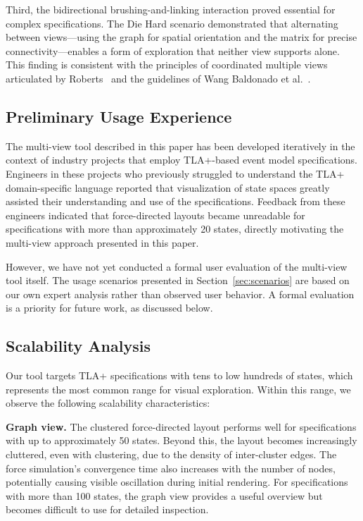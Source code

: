 \documentclass[conference]{IEEEtran}
\begin{document}
Third, the bidirectional brushing-and-linking interaction proved essential for complex specifications. The Die Hard scenario demonstrated that alternating between views---using the graph for spatial orientation and the matrix for precise connectivity---enables a form of exploration that neither view supports alone. This finding is consistent with the principles of coordinated multiple views articulated by Roberts~\cite{roberts2007cmv} and the guidelines of Wang Baldonado et al.~\cite{baldonado2000guidelines}.

\subsection{Preliminary Usage Experience}

The multi-view tool described in this paper has been developed iteratively in the context of industry projects that employ TLA+-based event model specifications. Engineers in these projects who previously struggled to understand the TLA+ domain-specific language reported that visualization of state spaces greatly assisted their understanding and use of the specifications. Feedback from these engineers indicated that force-directed layouts became unreadable for specifications with more than approximately 20 states, directly motivating the multi-view approach presented in this paper.

However, we have not yet conducted a formal user evaluation of the multi-view tool itself. The usage scenarios presented in Section~\ref{sec:scenarios} are based on our own expert analysis rather than observed user behavior. A formal evaluation is a priority for future work, as discussed below.

\subsection{Scalability Analysis}

Our tool targets TLA+ specifications with tens to low hundreds of states, which represents the most common range for visual exploration. Within this range, we observe the following scalability characteristics:

\textbf{Graph view.} The clustered force-directed layout performs well for specifications with up to approximately 50 states. Beyond this, the layout becomes increasingly cluttered, even with clustering, due to the density of inter-cluster edges. The force simulation's convergence time also increases with the number of nodes, potentially causing visible oscillation during initial rendering. For specifications with more than 100 states, the graph view provides a useful overview but becomes difficult to use for detailed inspection.
\end{document}
